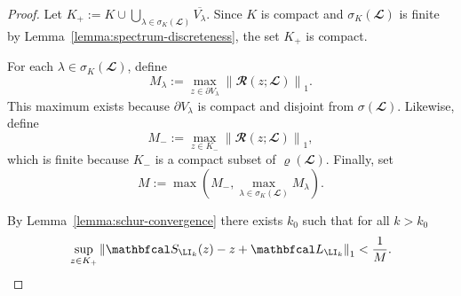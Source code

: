 \documentclass{SciPost}
\begin{document}
\begin{proof}
    Let
        $K_+
        :=
        K \cup \bigcup_{\lambda \in \sigma_K(\mathbfcal L)} \overline{V_\lambda}$.
    Since \(K\) is compact and \(\sigma_K(\mathbfcal L)\) is finite by Lemma~\ref{lemma:spectrum-discreteness}, the set \(K_+\) is compact.

    For each \(\lambda \in \sigma_K(\mathbfcal L)\), define
    \begin{equation}
        M_\lambda
        :=
        \max_{z \in \partial V_\lambda}
        \left \|
        \mathbfcal R(z;\mathbfcal L)
        \right \|_1 .
    \end{equation}
    This maximum exists because \(\partial V_\lambda\) is compact and disjoint from \(\sigma(\mathbfcal L)\). Likewise, define
    \begin{equation}
        M_-
        :=
        \max_{z \in K_-}
        \left \|
        \mathbfcal R(z;\mathbfcal L)
        \right \|_1 ,
    \end{equation}
    which is finite because \(K_-\) is a compact subset of \(\varrho(\mathbfcal L)\). Finally, set
    \begin{equation}
        M := \max\left(M_-, \max_{\lambda \in \sigma_K(\mathbfcal L)} M_\lambda\right).
    \end{equation}

    By Lemma~\ref{lemma:schur-convergence} there exists \(k_0\) such that for all $k > k_0$
    \begin{equation}
        \sup_{z \in K_+}
        \left \|
        \mathbfcal S_{\LI_k}(z) - z + \mathbfcal L_{\LI_k}
        \right \|_1
        <
        \frac{1}{M}.
        \label{eq:small-schur-error}
    \end{equation}


\end{proof}
\end{document}
